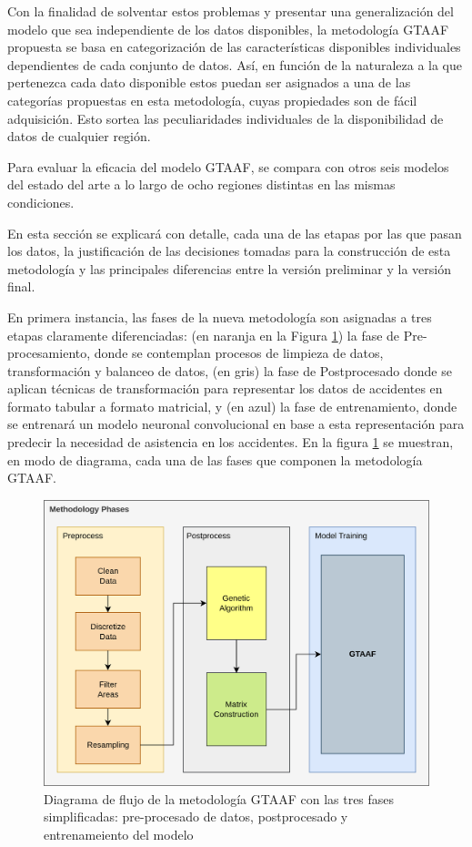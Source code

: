 Con la finalidad de solventar estos problemas y presentar una generalización del modelo que sea independiente de los datos disponibles, la metodología GTAAF propuesta se basa en categorización de las características disponibles individuales dependientes de cada conjunto de datos. Así, en función de la naturaleza a la que pertenezca cada dato disponible estos puedan ser asignados a una de las categorías propuestas en esta metodología, cuyas propiedades son de fácil adquisición. Esto sortea las peculiaridades individuales de la disponibilidad de datos de cualquier región. 

Para evaluar la eficacia del modelo GTAAF, se compara con otros seis modelos del estado del arte a lo largo de ocho regiones distintas en las mismas condiciones.

En esta sección se explicará con detalle, cada una de las etapas por las que pasan los datos, la justificación de las decisiones tomadas para la construcción de esta metodología y las principales diferencias entre la versión preliminar y la versión final.

En primera instancia, las fases de la nueva metodología son asignadas a tres etapas claramente diferenciadas: (en naranja en la Figura \ref{DataFlow}) la fase de Pre-procesamiento, donde se contemplan procesos de limpieza de datos, transformación y balanceo de datos, (en gris) la fase de Postprocesado donde se aplican técnicas de transformación para representar los datos de accidentes en formato tabular a formato matricial, y (en azul) la fase de entrenamiento, donde se entrenará un modelo neuronal convolucional en base a esta representación para predecir la necesidad de asistencia en los accidentes. En la figura \ref{DataFlow} se muestran, en modo de diagrama, cada una de las fases que componen la metodología GTAAF.

\begin{figure}[H]
	\centering
	\includegraphics[width=14cm]{Figures/7th DataFlow Chart.png}
	\caption{Diagrama de flujo de la metodología GTAAF con las tres fases simplificadas: pre-procesado de datos, postprocesado y entrenameiento del modelo}
	\label{DataFlow}
\end{figure}


